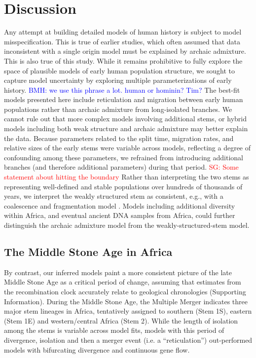\documentclass{article}
\newcommand{\sgcomment}[1]{{\textcolor{red}{SG: #1}}}
\newcommand{\bmhcomment}[1]{{\textcolor{blue}{BMH: #1}}}
\begin{document}
\section*{Discussion}

Any attempt at building detailed models of human history is subject to model
misspecification. This is true of earlier studies, which often assumed that
data inconsistent with a single origin model must be explained by archaic
admixture. This is also true of this study. While it remains prohibitive to
fully explore the space of plausible models of early human population structure,
we sought to capture model uncertainty by exploring multiple parameterizations of
early history.
\bmhcomment{we use this phrase a lot. human or hominin? Tim?}
The best-fit models presented here include reticulation and migration between
early human populations rather than archaic admixture from long-isolated branches.
We cannot rule out that more complex models involving
additional stems, or hybrid models including both weak structure and archaic
admixture may better explain the data. Because parameters related to the split
time, migration rates, and relative sizes of the early stems were variable
across models, reflecting a degree of confounding among these parameters, we
refrained from introducing additional branches (and therefore additional
parameters) during that period.
\sgcomment{Some statement about hitting the boundary}
Rather than interpreting the two stems as representing well-defined
and stable populations over hundreds of thousands of years, we interpret the
weakly structured stem as consistent, e.g., with a coalescence and
fragmentation model \citep{Scerri2019-xg}.
Models including additional diversity within Africa,
and eventual ancient DNA samples from Africa, could further distinguish
the archaic admixture model from the weakly-structured-stem model.

\subsection*{The Middle Stone Age in Africa}

By contrast, our inferred models paint a more consistent picture of the late
Middle Stone Age as a critical period of change, assuming that estimates from
the recombination clock accurately relate to geological chronologies
(Supporting Information).
During the Middle Stone Age, the Multiple Merger indicates three
major stem lineages in Africa, tentatively assigned to southern (Stem 1S),
eastern (Stem 1E) and western/central Africa (Stem 2). While the length of
isolation among the stems is variable across model fits, models with this
period of divergence, isolation and then a merger event (i.e. a “reticulation”)
out-performed models with bifurcating divergence and continuous gene flow. 
\end{document}
